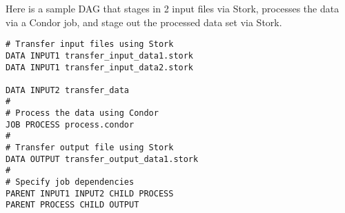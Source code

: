 Here is a sample DAG that stages in 2 input files via Stork, processes the data
via a Condor job, and stage out the processed data set via Stork.

\begin{verbatim}
# Transfer input files using Stork
DATA INPUT1	transfer_input_data1.stork
DATA INPUT1	transfer_input_data2.stork

DATA INPUT2	transfer_data
#
# Process the data using Condor
JOB PROCESS process.condor
#
# Transfer output file using Stork
DATA OUTPUT	transfer_output_data1.stork
#
# Specify job dependencies
PARENT INPUT1 INPUT2 CHILD PROCESS
PARENT PROCESS CHILD OUTPUT
\end{verbatim}

